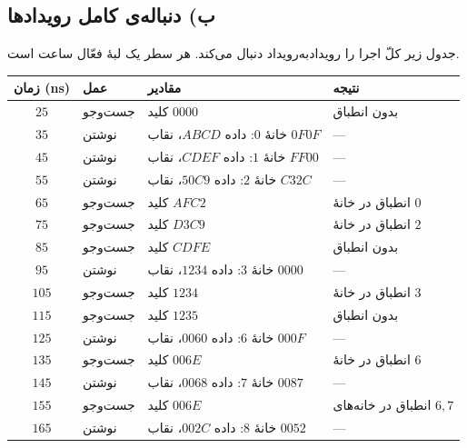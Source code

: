 \documentclass[12pt,a4paper]{article}
\begin{document}

	\subsection*{ب) دنباله‌ی کامل رویدادها}
	جدول زیر کلّ اجرا را رویداد‌به‌رویداد دنبال می‌کند. هر سطر یک لبهٔ فعّال ساعت است.

	\begin{table}[H]
		\centering
		\footnotesize
		\begin{tabular}{|c|l|l|l|}
			\hline
			\textbf{زمان (ns)} & \textbf{عمل} & \textbf{مقادیر} & \textbf{نتیجه} \\ \hline
			\(25\)  & جست‌وجو & کلید \(0000\)                       & بدون انطباق \\ \hline
			\(35\)  & نوشتن   & خانهٔ \(0\): داده \(ABCD\)، نقاب \(0F0F\) & --- \\ \hline
			\(45\)  & نوشتن   & خانهٔ \(1\): داده \(CDEF\)، نقاب \(FF00\) & --- \\ \hline
			\(55\)  & نوشتن   & خانهٔ \(2\): داده \(50C9\)، نقاب \(C32C\) & --- \\ \hline
			\(65\)  & جست‌وجو & کلید \(AFC2\)                       & انطباق در خانهٔ \(0\) \\ \hline
			\(75\)  & جست‌وجو & کلید \(D3C9\)                       & انطباق در خانهٔ \(2\) \\ \hline
			\(85\)  & جست‌وجو & کلید \(CDFE\)                       & بدون انطباق \\ \hline
			\(95\)  & نوشتن   & خانهٔ \(3\): داده \(1234\)، نقاب \(0000\) & --- \\ \hline
			\(105\) & جست‌وجو & کلید \(1234\)                       & انطباق در خانهٔ \(3\) \\ \hline
			\(115\) & جست‌وجو & کلید \(1235\)                       & بدون انطباق \\ \hline
			\(125\) & نوشتن   & خانهٔ \(6\): داده \(0060\)، نقاب \(000F\) & --- \\ \hline
			\(135\) & جست‌وجو & کلید \(006E\)                       & انطباق در خانهٔ \(6\) \\ \hline
			\(145\) & نوشتن   & خانهٔ \(7\): داده \(0068\)، نقاب \(0087\) & --- \\ \hline
			\(155\) & جست‌وجو & کلید \(006E\)                       & انطباق در خانه‌های \(6,7\) \\ \hline
			\(165\) & نوشتن   & خانهٔ \(8\): داده \(002C\)، نقاب \(0052\) & --- \\ \hline

\end{tabular}
\end{table}
\end{document}
